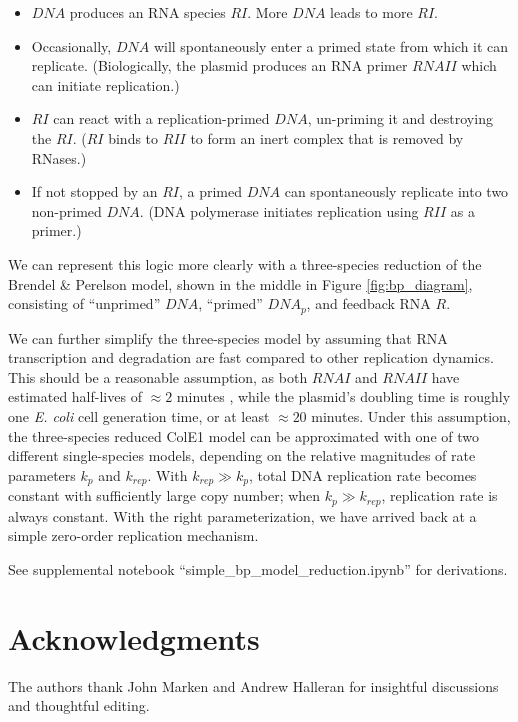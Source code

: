 \documentclass[journal = jacsat,manuscript = note]{achemso}
\begin{document}
\begin{itemize}
	\item $\mathit{DNA}$ produces an RNA species $RI$. More $\mathit{DNA}$ leads to more $RI$. 
	\item Occasionally, $\mathit{DNA}$ will spontaneously enter a primed state from which it can replicate. (Biologically, the plasmid produces an RNA primer $RNAII$ which can initiate replication.)
	\item $RI$ can react with a replication-primed $\mathit{DNA}$, un-priming it and destroying the $RI$. ($RI$ binds to $RII$ to form an inert complex that is removed by RNases.)
	\item If not stopped by an $RI$, a primed $\mathit{DNA}$ can spontaneously replicate into two non-primed $\mathit{DNA}$. (DNA polymerase initiates replication using $RII$ as a primer.)
\end{itemize}

We can represent this logic more clearly with a three-species reduction of the Brendel \& Perelson model, shown in the middle in Figure \ref{fig:bp_diagram}, consisting of ``unprimed'' $\mathit{DNA}$, ``primed'' $\mathit{DNA}_p$, and feedback RNA $R$. 

We can further simplify the three-species model by assuming that RNA transcription and degradation are fast compared to other replication dynamics. This should be a reasonable assumption, as both $RNAI$ and $RNAII$ have estimated half-lives of $\approx 2$ minutes \cite{Brendel1993}, while the plasmid's doubling time is roughly one \emph{E. coli} cell generation time, or at least $\approx 20$ minutes. Under this assumption, the three-species reduced ColE1 model can be approximated with one of two different single-species models, depending on the relative magnitudes of rate parameters $k_p$ and $k_{rep}$. With $k_{rep}\gg k_p$, total DNA replication rate becomes constant with sufficiently large copy number; when $k_p\gg k_{rep}$, replication rate is always constant. With the right parameterization, we have arrived back at a simple zero-order replication mechanism. 

See supplemental notebook ``simple\_bp\_model\_reduction.ipynb'' for derivations. 

\section{Acknowledgments}

The authors thank John Marken and Andrew Halleran for insightful discussions and thoughtful editing. 
\end{document}
